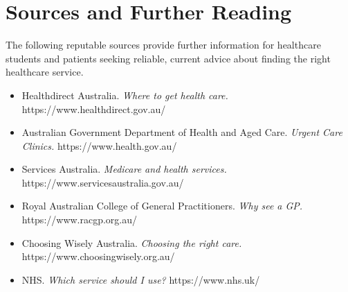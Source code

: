 \section*{Sources and Further Reading}
The following reputable sources provide further information for healthcare students and patients seeking reliable, current advice about finding the right healthcare service.

\begin{itemize}
    \item Healthdirect Australia. \textit{Where to get health care.} https://www.healthdirect.gov.au/
    \item Australian Government Department of Health and Aged Care. \textit{Urgent Care Clinics.} https://www.health.gov.au/
    \item Services Australia. \textit{Medicare and health services.} https://www.servicesaustralia.gov.au/
    \item Royal Australian College of General Practitioners. \textit{Why see a GP.} https://www.racgp.org.au/
    \item Choosing Wisely Australia. \textit{Choosing the right care.} https://www.choosingwisely.org.au/
    \item NHS. \textit{Which service should I use?} https://www.nhs.uk/
\end{itemize}
